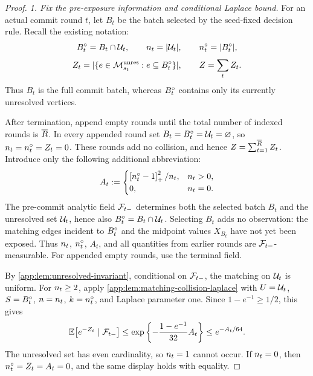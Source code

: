 \begin{proof}

\emph{1. Fix the pre-exposure information and conditional Laplace bound.}
For an actual commit round \(t\), let \(B_t\) be the batch selected by the
seed-fixed decision rule. Recall the existing notation:
\[
 B_{t}^{\circ}=B_t\cap\mathcal U_{t},
 \qquad
 n_{t}=|\mathcal U_{t}|,
 \qquad
 n_{t}^{\circ}=|B_{t}^{\circ}|,
\]
\[
 Z_{t}
 =|\{e\in\mathcal M_{s_t}^{\mathrm{unres}}:
                    e\subseteq B_{t}^{\circ}\}|,
 \qquad
 Z=\sum_tZ_{t}.
\]
Thus \(B_t\) is the full commit batch, whereas \(B_{t}^{\circ}\)
contains only its currently unresolved vertices.

After termination, append empty rounds until the total number of indexed
rounds is \(\overline R{}\). In every appended round set
\(B_t=B_{t}^{\circ}=\mathcal U_{t}=\varnothing\), so
\(n_{t}=n_{t}^{\circ}=Z_{t}=0\).
These rounds add no collision, and hence
\(Z=\sum_{t=1}^{\overline R{}}Z_{t}\).
Introduce only the following additional abbreviation:
\[
 A_t:=
 \begin{cases}
  \left[n_{t}^{\circ}-1\right]_+^2/n_{t},
      &n_{t}>0,\\
  0,&n_{t}=0.
 \end{cases}
\]
The pre-commit analytic field \(\mathcal F_{t-}\) determines both the
selected batch \(B_t\) and the unresolved set \(\mathcal U_{t}\),
hence also \(B_{t}^{\circ}=B_t\cap\mathcal U_{t}\).
Selecting \(B_t\) adds no observation: the matching edges incident to
\(B_{t}^{\circ}\) and the midpoint values \(X_{B_t}\) have not yet been
exposed. Thus \(n_{t}\), \(n_{t}^{\circ}\),
\(A_t\), and all quantities from earlier rounds are
\(\mathcal F_{t-}\)-measurable. For appended empty rounds, use the terminal
field.

By \cref{app:lem:unresolved-invariant}, conditional on \(\mathcal F_{t-}\),
the matching on \(\mathcal U_{t}\) is uniform. For
\(n_{t}\ge2\), apply
\cref{app:lem:matching-collision-laplace} with
\(U=\mathcal U_{t}\), \(S=B_{t}^{\circ}\),
\(n=n_{t}\), \(k=n_{t}^{\circ}\), and Laplace
parameter one. Since \(1-e^{-1}\ge1/2\), this gives
\begin{equation}
 \mathbb E\!\left[e^{-Z_{t}}\mid\mathcal F_{t-}\right]
 \le
 \exp\left\{-\frac{1-e^{-1}}{32}A_t\right\}
 \le e^{-A_t/64}.
 \label{app:eq:conditional-collision-laplace}
\end{equation}
The unresolved set has even cardinality, so
\(n_{t}=1\) cannot occur. If
\(n_{t}=0\), then
\(n_{t}^{\circ}=Z_{t}=A_t=0\), and the same display holds
with equality.



\end{proof}
